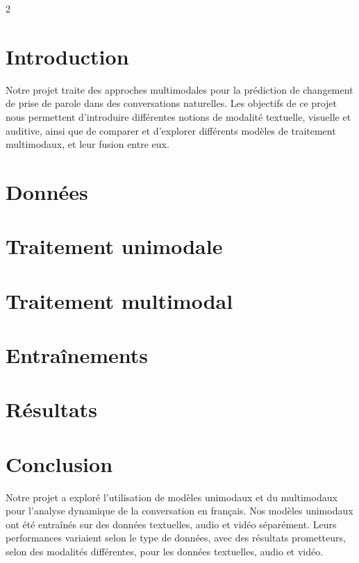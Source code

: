\documentclass[a4paper]{llncs}
\begin{document}
\begin{multicols}{2}

\section{Introduction}
Notre projet traite des approches multimodales pour la prédiction de changement de prise de parole dans des conversations naturelles. 
Les objectifs de ce projet nous permettent d'introduire différentes notions de modalité textuelle, visuelle et auditive, ainsi que de
comparer et d'explorer différents modèles de traitement multimodaux, et leur fusion entre eux.

\section{Données}


\section{Traitement unimodale}


\section{Traitement multimodal}


\section{Entraînements}


\section{Résultats}



\section{Conclusion}

Notre projet a exploré l'utilisation de modèles unimodaux et du multimodaux pour l'analyse dynamique de la conversation en français.
Nos modèles unimodaux ont été entraînés sur des données textuelles, audio et vidéo séparément. 
Leurs performances variaient selon le type de données, avec des résultats prometteurs, selon des modalités différentes, pour les données textuelles, audio et vidéo.


\end{multicols}
\end{document}
